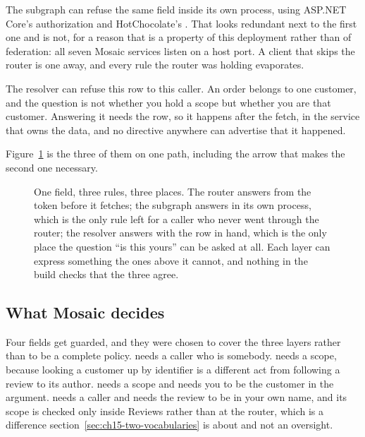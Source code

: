 %
The subgraph can refuse the same field inside its own process, using ASP.NET
Core's authorization and HotChocolate's \code{[Authorize]}. That looks redundant
next to the first one and is not, for a reason that is a property of this
deployment rather than of federation: all seven Mosaic services listen on a host
port. A client that skips the router is one  away, and every rule the
router was holding evaporates.

%
The resolver can refuse this row to this caller. An order belongs to one
customer, and the question is not whether you hold a scope but whether you are
that customer. Answering it needs the row, so it happens after the fetch, in the
service that owns the data, and no directive anywhere can advertise that it
happened.

Figure~\ref{fig:ch15-three-layers} is the three of them on one path, including
the arrow that makes the second one necessary.

\begin{figure}[htbp]
  \centering
  
  \caption{One field, three rules, three places. The router answers from the
  token before it fetches; the subgraph answers in its own process, which is the
  only rule left for a caller who never went through the router; the resolver
  answers with the row in hand, which is the only place the question \enquote{is
  this yours} can be asked at all. Each layer can express something the ones
  above it cannot, and nothing in the build checks that the three agree.}
  \label{fig:ch15-three-layers}
\end{figure}

\subsection*{What Mosaic decides}

%
Four fields get guarded, and they were chosen to cover the three layers rather
than to be a complete policy.  needs a caller who is
somebody.  needs a scope, because looking a customer up
by identifier is a different act from following a review to its author.
 needs a scope and needs you to be the customer in
the argument.  needs a caller and needs the review to be in
your own name, and its scope is checked only inside Reviews rather than at the
router, which is a difference section~\ref{sec:ch15-two-vocabularies} is about
and not an oversight.


